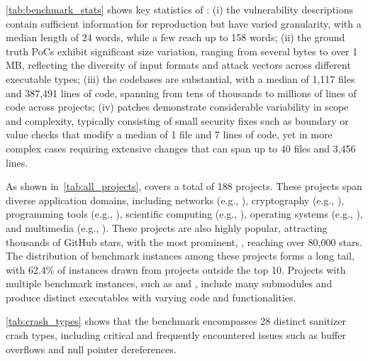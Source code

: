 \cref{tab:benchmark_stats} shows key statistics of \sysname: (i) the vulnerability descriptions contain sufficient information for reproduction but have varied granularity, with a median length of 24 words, while a few reach up to 158 words; (ii) the ground truth PoCs exhibit significant size variation, ranging from several bytes to over 1 MB, reflecting the diversity of input formats and attack vectors across different executable types; (iii) the codebases are substantial, with a median of 1,117 files and 387,491 lines of code, spanning from tens of thousands to millions of lines of code across projects; (iv) patches demonstrate considerable variability in scope and complexity, typically consisting of small security fixes such as boundary or value checks that modify a median of 1 file and 7 lines of code, yet in more complex cases requiring extensive changes that can span up to 40 files and 3,456 lines.

As shown in~\cref{tab:all_projects}, \sysname covers a total of 188 projects.
These projects span diverse application domains, including networks (e.g., \cite{curl_repo}), cryptography (e.g., \cite{openssl_repo}), programming tools (e.g., \cite{binuils_repo}), scientific computing (e.g., \cite{gdal_repo}), operating systems (e.g., \cite{qemu_repo}), and multimedia (e.g., \cite{ffmpeg_repo}).
These projects are also highly popular, attracting thousands of GitHub stars, with the most prominent, \citet{opencv_repo}, reaching over 80,000 stars.
The distribution of benchmark instances among these projects forms a long tail, with 62.4\% of instances drawn from projects outside the top 10.
Projects with multiple benchmark instances, such as \cite{binuils_repo} and \cite{ffmpeg_repo}, include many submodules and produce distinct executables with varying code and functionalities.

\cref{tab:crash_types} shows that the benchmark encompasses 28 distinct sanitizer crash types, including critical and frequently encountered issues such as buffer overflows and null pointer dereferences.
